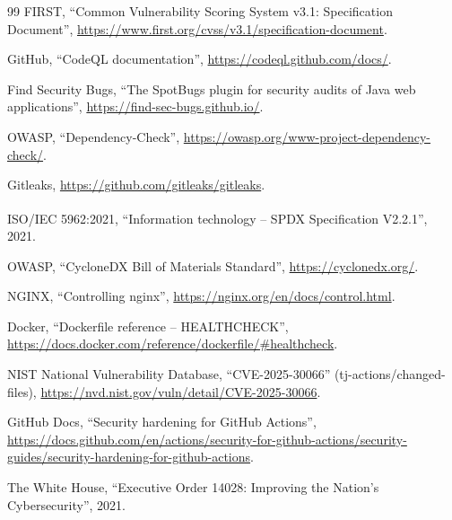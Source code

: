 \documentclass[12pt,a4paper,oneside]{extreport}
\begin{document}
\begin{thebibliography}{99}
  FIRST, ``Common Vulnerability Scoring System v3.1: Specification Document'',
  \url{https://www.first.org/cvss/v3.1/specification-document}.

  GitHub, ``CodeQL documentation'', \url{https://codeql.github.com/docs/}.

  Find Security Bugs, ``The SpotBugs plugin for security audits of Java web
  applications'', \url{https://find-sec-bugs.github.io/}.

  OWASP, ``Dependency-Check'',
  \url{https://owasp.org/www-project-dependency-check/}.

  Gitleaks, \url{https://github.com/gitleaks/gitleaks}.

  ISO/IEC 5962:2021, ``Information technology -- SPDX\textsuperscript{\textregistered}
  Specification V2.2.1'', 2021.

  OWASP, ``CycloneDX Bill of Materials Standard'', \url{https://cyclonedx.org/}.

  NGINX, ``Controlling nginx'', \url{https://nginx.org/en/docs/control.html}.

  Docker, ``Dockerfile reference -- HEALTHCHECK'',
  \url{https://docs.docker.com/reference/dockerfile/\#healthcheck}.

  NIST National Vulnerability Database, ``CVE-2025-30066'' (tj-actions/changed-files),
  \url{https://nvd.nist.gov/vuln/detail/CVE-2025-30066}.

  GitHub Docs, ``Security hardening for GitHub Actions'',
  \url{https://docs.github.com/en/actions/security-for-github-actions/security-guides/security-hardening-for-github-actions}.

  The White House, ``Executive Order 14028: Improving the Nation's
  Cybersecurity'', 2021.
\end{thebibliography}
\end{document}
